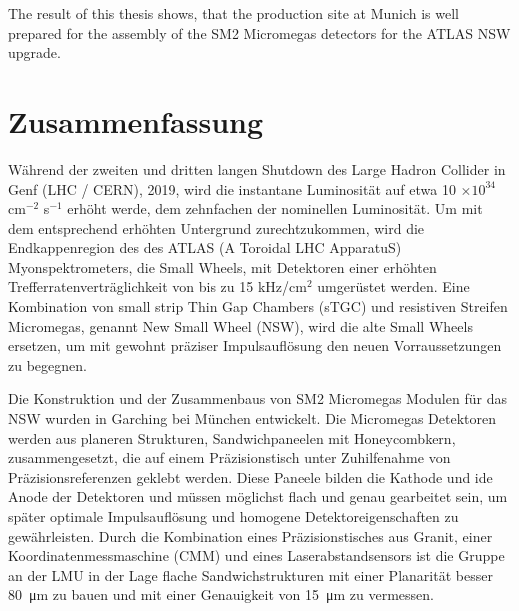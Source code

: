 \documentclass[
a4paper,                                %
twoside,                                %
BCOR1.4cm,                      %
10pt,                           %
headings=normal,                %
headsepline,                    %
clearplainpage, %
final,                                  %
div=14,
parskip=full,
openright,
bibliography=toc
]{scrreprt}
\begin{document}
The result of this thesis shows, that the production site at Munich is well prepared for the assembly of the SM2 Micromegas detectors for the ATLAS NSW upgrade.

\thispagestyle{empty}
\cleardoublepage

\chapter*{Zusammenfassung}

W\"ahrend der zweiten und dritten langen Shutdown des Large Hadron Collider in Genf (LHC / CERN), 2019, wird die instantane Luminosit\"at auf etwa 10 $\times 10^{34}$ cm$^{-2}$ s$^{-1}$ erh\"oht werde, dem zehnfachen der nominellen Luminosit\"at. Um mit dem entsprechend erh\"ohten Untergrund zurechtzukommen, wird die Endkappenregion des des ATLAS (A Toroidal LHC ApparatuS) Myonspektrometers, die Small Wheels, mit Detektoren einer erh\"ohten Trefferratenvertr\"aglichkeit von bis zu 15 kHz/cm$^{2}$ umger\"ustet werden. Eine Kombination von small strip Thin Gap Chambers (sTGC) und resistiven Streifen Micromegas, genannt New Small Wheel (NSW), wird die alte Small Wheels ersetzen, um mit gewohnt pr\"aziser Impulsaufl\"osung den neuen Vorraussetzungen zu begegnen. 

Die Konstruktion und der Zusammenbaus von SM2 Micromegas Modulen f\"ur das NSW wurden in Garching bei M\"unchen entwickelt. Die Micromegas Detektoren werden aus planeren Strukturen, Sandwichpaneelen mit Honeycombkern, zusammengesetzt, die auf einem Pr\"azisionstisch unter Zuhilfenahme von Pr\"azisionsreferenzen geklebt werden. Diese Paneele bilden die Kathode und ide Anode der Detektoren und m\"ussen m\"oglichst flach und genau gearbeitet sein, um sp\"ater optimale Impulsaufl\"osung und homogene Detektoreigenschaften zu gew\"ahrleisten. Durch die Kombination eines Pr\"azisionstisches aus Granit, einer Koordinatenmessmaschine (CMM) und eines Laserabstandsensors ist die Gruppe an der LMU in der Lage flache Sandwichstrukturen mit einer Planarit\"at besser \SI{80}{\micro\m} zu bauen und mit einer Genauigkeit von \SI{15}{\micro\m} zu vermessen.
\end{document}

